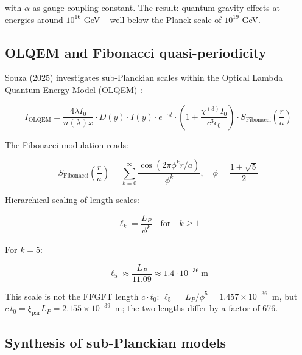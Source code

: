 	with $\alpha$ as gauge coupling constant. The result: quantum gravity effects at energies around $10^{16}$ GeV -- well below the Planck scale of $10^{19}$ GeV.
	
	\subsection{OLQEM and Fibonacci quasi-periodicity}
	
	Souza (2025) investigates sub-Planckian scales within the Optical Lambda Quantum Energy Model (OLQEM) \cite{subPlanck2025}:
	
	\begin{equation}
		I_{\text{OLQEM}} = \frac{4\lambda I_0}{n(\lambda)x} \cdot D(y) \cdot I(y) \cdot e^{-\gamma t} \cdot \left(1+\frac{\chi^{(3)}I_0}{c^3\epsilon_0}\right) \cdot S_{\text{Fibonacci}}\left(\frac{r}{a}\right)
	\end{equation}
	
	The Fibonacci modulation reads:
	
	\begin{equation}
		S_{\text{Fibonacci}}\left(\frac{r}{a}\right) = \sum_{k=0}^{\infty} \frac{\cos(2\pi \phi^k r/a)}{\phi^k}, \quad \phi = \frac{1+\sqrt{5}}{2}
	\end{equation}
	
	Hierarchical scaling of length scales:
	
	\begin{equation}
		\ell_k = \frac{L_P}{\phi^{k}} \quad \text{for} \quad k \ge 1
	\end{equation}
	
	For $k=5$:
	
	\begin{equation}
		\ell_5 \approx \frac{L_P}{11.09} \approx 1.4 \cdot 10^{-36}~\text{m}
	\end{equation}
	
	This scale is not the FFGFT length $c \cdot t_0$: $\ell_5 = L_P/\phi^5 = 1.457\times 10^{-36}$~m, but $c\,t_0 = \xi_{\text{par}} L_P = 2.155\times 10^{-39}$~m; the two lengths differ by a factor of 676.
	
	\subsection{Synthesis of sub-Planckian models}
	
	\begin{table}[h]
		\centering
		\caption{Comparison of sub-Planckian models}
		{\footnotesize{}} %
	\end{table}
	
